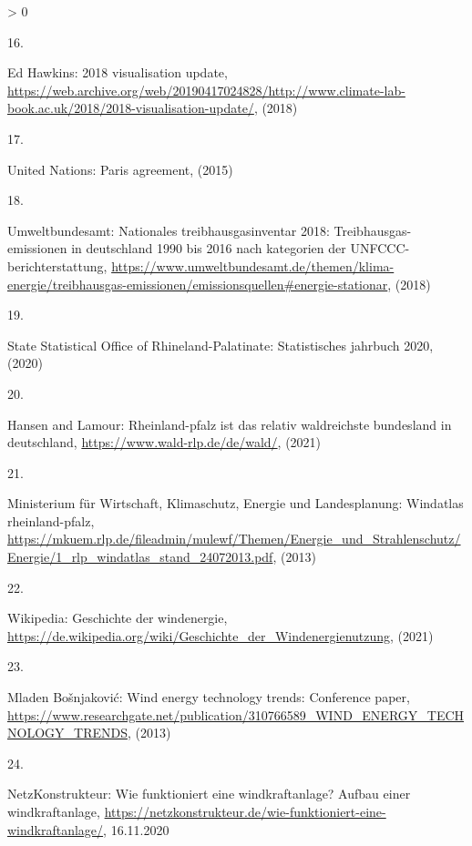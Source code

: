 \documentclass[a4paper,11pt]{article}
\newlength{\cslhangindent}
\newlength{\csllabelwidth}
\newenvironment{CSLReferences}[3] %
 {%
  \setlength{\parindent}{0pt}
  \ifodd #1 \everypar{\setlength{\hangindent}{\cslhangindent}}\ignorespaces\fi
  \ifnum #2 > 0
  \setlength{\parskip}{#2\baselineskip}
  \fi
 }%
 {}
\newcommand{\CSLLeftMargin}[1]{\parbox[t]{\maxof{\widthof{#1}}{\csllabelwidth}}{#1}}
\newcommand{\CSLRightInline}[1]{\parbox[t]{\linewidth}{#1}}
\begin{document}
\begin{CSLReferences}{0}{0}
\leavevmode\hypertarget{ref-EdHawkins.2018}{}%
\CSLLeftMargin{16. }
\CSLRightInline{Ed Hawkins: 2018 visualisation update, \url{https://web.archive.org/web/20190417024828/http://www.climate-lab-book.ac.uk/2018/2018-visualisation-update/}, (2018)}

\leavevmode\hypertarget{ref-UnitedNations.2015}{}%
\CSLLeftMargin{17. }
\CSLRightInline{United Nations: Paris agreement, (2015)}

\leavevmode\hypertarget{ref-Umweltbundesamt.2018}{}%
\CSLLeftMargin{18. }
\CSLRightInline{Umweltbundesamt: Nationales treibhausgasinventar 2018: Treibhausgas-emissionen in deutschland 1990 bis 2016 nach kategorien der UNFCCC-berichterstattung, \url{https://www.umweltbundesamt.de/themen/klima-energie/treibhausgas-emissionen/emissionsquellen\#energie-stationar}, (2018)}

\leavevmode\hypertarget{ref-StateStatisticalOfficeofRhinelandPalatinate.2020}{}%
\CSLLeftMargin{19. }
\CSLRightInline{State Statistical Office of Rhineland-Palatinate: Statistisches jahrbuch 2020, (2020)}

\leavevmode\hypertarget{ref-HansenandLamour.2021}{}%
\CSLLeftMargin{20. }
\CSLRightInline{Hansen and Lamour: Rheinland-pfalz ist das relativ waldreichste bundesland in deutschland, \url{https://www.wald-rlp.de/de/wald/}, (2021)}

\leavevmode\hypertarget{ref-MinisteriumfurWirtschaftKlimaschutzEnergieundLandesplanung.2013}{}%
\CSLLeftMargin{21. }
\CSLRightInline{Ministerium für Wirtschaft, Klimaschutz, Energie und Landesplanung: Windatlas rheinland-pfalz, \url{https://mkuem.rlp.de/fileadmin/mulewf/Themen/Energie_und_Strahlenschutz/Energie/1_rlp_windatlas_stand_24072013.pdf}, (2013)}

\leavevmode\hypertarget{ref-Wikipedia.2021}{}%
\CSLLeftMargin{22. }
\CSLRightInline{Wikipedia: Geschichte der windenergie, \url{https://de.wikipedia.org/wiki/Geschichte_der_Windenergienutzung}, (2021)}

\leavevmode\hypertarget{ref-MladenBosnjakovic.2013}{}%
\CSLLeftMargin{23. }
\CSLRightInline{Mladen Bošnjaković: Wind energy technology trends: Conference paper, \url{https://www.researchgate.net/publication/310766589_WIND_ENERGY_TECHNOLOGY_TRENDS}, (2013)}

\leavevmode\hypertarget{ref-NetzKonstrukteur.16.11.2020}{}%
\CSLLeftMargin{24. }
\CSLRightInline{NetzKonstrukteur: Wie funktioniert eine windkraftanlage? Aufbau einer windkraftanlage, \url{https://netzkonstrukteur.de/wie-funktioniert-eine-windkraftanlage/}, 16.11.2020}


\end{CSLReferences}
\end{document}
